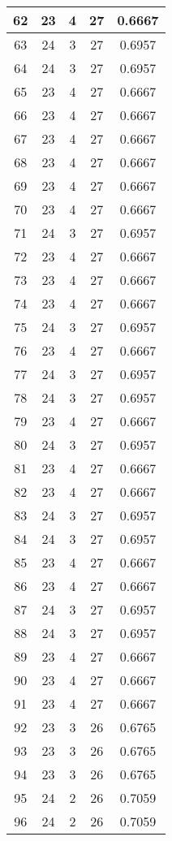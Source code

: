\documentclass[letterpaper, 12pt]{article}
\begin{document}
\begin{longtable}{|c|c|c|c|c|}
\hline
62 & 23 & 4 & 27 & 0.6667 \\
\hline
63 & 24 & 3 & 27 & 0.6957 \\
\hline
64 & 24 & 3 & 27 & 0.6957 \\
\hline
65 & 23 & 4 & 27 & 0.6667 \\
\hline
66 & 23 & 4 & 27 & 0.6667 \\
\hline
67 & 23 & 4 & 27 & 0.6667 \\
\hline
68 & 23 & 4 & 27 & 0.6667 \\
\hline
69 & 23 & 4 & 27 & 0.6667 \\
\hline
70 & 23 & 4 & 27 & 0.6667 \\
\hline
71 & 24 & 3 & 27 & 0.6957 \\
\hline
72 & 23 & 4 & 27 & 0.6667 \\
\hline
73 & 23 & 4 & 27 & 0.6667 \\
\hline
74 & 23 & 4 & 27 & 0.6667 \\
\hline
75 & 24 & 3 & 27 & 0.6957 \\
\hline
76 & 23 & 4 & 27 & 0.6667 \\
\hline
77 & 24 & 3 & 27 & 0.6957 \\
\hline
78 & 24 & 3 & 27 & 0.6957 \\
\hline
79 & 23 & 4 & 27 & 0.6667 \\
\hline
80 & 24 & 3 & 27 & 0.6957 \\
\hline
81 & 23 & 4 & 27 & 0.6667 \\
\hline
82 & 23 & 4 & 27 & 0.6667 \\
\hline
83 & 24 & 3 & 27 & 0.6957 \\
\hline
84 & 24 & 3 & 27 & 0.6957 \\
\hline
85 & 23 & 4 & 27 & 0.6667 \\
\hline
86 & 23 & 4 & 27 & 0.6667 \\
\hline
87 & 24 & 3 & 27 & 0.6957 \\
\hline
88 & 24 & 3 & 27 & 0.6957 \\
\hline
89 & 23 & 4 & 27 & 0.6667 \\
\hline
90 & 23 & 4 & 27 & 0.6667 \\
\hline
91 & 23 & 4 & 27 & 0.6667 \\
\hline
92 & 23 & 3 & 26 & 0.6765 \\
\hline
93 & 23 & 3 & 26 & 0.6765 \\
\hline
94 & 23 & 3 & 26 & 0.6765 \\
\hline
95 & 24 & 2 & 26 & 0.7059 \\
\hline
96 & 24 & 2 & 26 & 0.7059 \\

\end{longtable}
\end{document}
